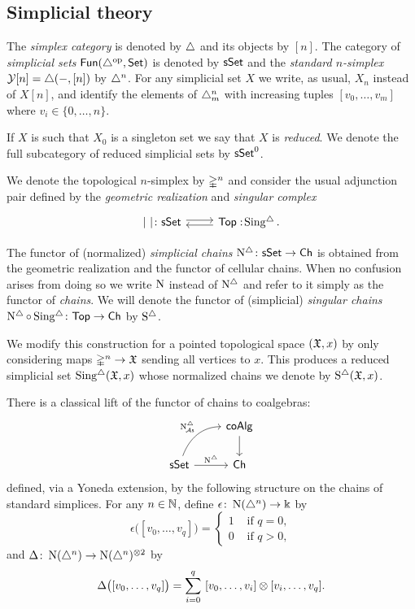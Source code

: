 \subsection{Simplicial theory}\label{ss:simplicial}

The \textit{simplex category} is denoted by $\triangle$ and its objects by $[n]$.
The category of \textit{simplicial sets} $\mathsf{Fun}(\triangle^{\mathrm{op}}, \mathsf{Set})$ is denoted by $\mathsf{sSet}$ and the \textit{standard $n$-simplex} $\operatorname{\mathcal{Y}} [n] = \triangle(-, [n])$ by $\triangle^n$.
For any simplicial set $X$ we write, as usual, $X_n$ instead of $X[n]$, and identify the elements of $\triangle^n_m$ with increasing tuples $[v_0, \dots, v_m]$ where $v_i \in \{0, \dots, n\}$.

If $X$ is such that $X_0$ is a singleton set we say that $X$ is \textit{reduced}.
We denote the full subcategory of reduced simplicial sets by $\mathsf{sSet}^0$.

We denote the topological $n$-simplex by $\mathbb{\Delta}^{n}$ and consider the usual adjunction pair defined by the \textit{geometric realization} and \textit{singular complex}
\[
\begin{tikzcd}
	\bars{\ } \colon \sSet  \arrow[r, shift left=.5ex] &
	\Top :\! \sSing. \arrow[l, shift left=.5ex]
\end{tikzcd}
\]

The functor of (normalized) \textit{simplicial chains} $\operatorname{N^{\triangle}} \colon \mathsf{sSet} \to \mathsf{Ch}$ is obtained from the geometric realization and the functor of cellular chains.
When no confusion arises from doing so we write $\operatorname{N}$ instead of $\operatorname{N^{\triangle}}$ and refer to it simply as the functor of \textit{chains}.
We will denote the functor of (simplicial) \textit{singular chains} $\operatorname{N^{\triangle}} \circ \operatorname{Sing^{\triangle}} \colon \mathsf{Top} \to \mathsf{Ch}$ by $\operatorname{S^{\triangle}}$.

We modify this construction for a pointed topological space $(\mathfrak{X},x)$ by only considering maps $\mathbb{\Delta}^n \to \mathfrak{X}$ sending all vertices to $x$.
This produces a reduced simplicial set $\operatorname{Sing^{\triangle}}(\mathfrak{X},x)$ whose normalized chains we denote by $\operatorname{S^{\triangle}}(\mathfrak{X},x)$.

There is a classical lift of the functor of chains to coalgebras:
\[
\begin{tikzcd}
	& \coAlg \arrow[d] \\
	\sSet \arrow[r, "\schains"] \arrow[ur, "\schainsA", out=70, in=180] & \Ch
\end{tikzcd}
\]
defined, via a Yoneda extension, by the following structure on the chains of standard simplices.
For any $n \in \mathbb{N}$, define $\epsilon \colon \operatorname{N}(\triangle^n) \to \Bbbk$ by
\[
\epsilon \big( [v_0, \dots, v_q] \big) = \begin{cases} 1 & \text{ if } q = 0, \\ 0 & \text{ if } q>0, \end{cases}
\]
and $\Delta \colon \operatorname{N}(\triangle^n) \to \operatorname{N}(\triangle^n)^{\otimes2}$ by
\[
\Delta \big( [v_0, \dots, v_q] \big) = \sum_{i=0}^q \ [v_0, \dots, v_i] \otimes [v_i, \dots, v_q].
\]

